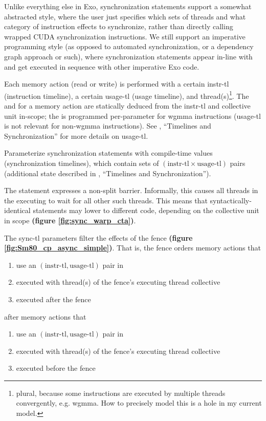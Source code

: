 Unlike everything else in Exo, synchronization statements support a somewhat abstracted style, where the user just specifies which sets of threads and what category of instruction effects to synchronize, rather than directly calling wrapped CUDA synchronization instructions.
We still support an imperative programming style (as opposed to automated synchronization, or a dependency graph approach or such), where synchronization statements appear in-line with and get executed in sequence with other imperative Exo code.

\filbreak
{} Each memory action (read or write) is performed with a certain instr-tl (instruction timeline), a certain usage-tl (usage timeline), and thread(s)\footnote{plural, because some instructions are executed by multiple threads convergently, e.g. wgmma. How to precisely model this is a hole in my current model.}.
The  and  for a memory action are statically deduced from the instr-tl and collective unit in-scope; the  is programmed per-parameter for wgmma instructions (usage-tl is not relevant for non-wgmma instructions).
See , ``Timelines and Synchronization'' for more details on usage-tl.

\filbreak
Parameterize synchronization statements with compile-time  values (synchronization timelines), which contain sets of $(\text{instr-tl} \times \text{usage-tl})$ pairs (additional state described in , ``Timelines and Synchronization'').

\filbreak
{} The  statement expresses a non-split barrier.
Informally, this causes all threads in the executing  to wait for all other such threads.
This means that syntactically-identical  statements may lower to different code, depending on the collective unit in scope \textbf{(figure \ref{fig:sync_warp_cta})}.

\filbreak 
The sync-tl parameters filter the effects of the fence \textbf{(figure \ref{fig:Sm80_cp_async_simple})}.
That is, the fence orders memory actions that
\begin{enumerate}
  \item use an $(\text{instr-tl}, \text{usage-tl})$ pair in 
  \item executed with thread(s) of the fence's executing thread collective
  \item executed after the fence
\end{enumerate}
\filbreak
after memory actions that
\begin{enumerate}
  \item use an $(\text{instr-tl}, \text{usage-tl})$ pair in 
  \item executed with thread(s) of the fence's executing thread collective
  \item executed before the fence
\end{enumerate}

